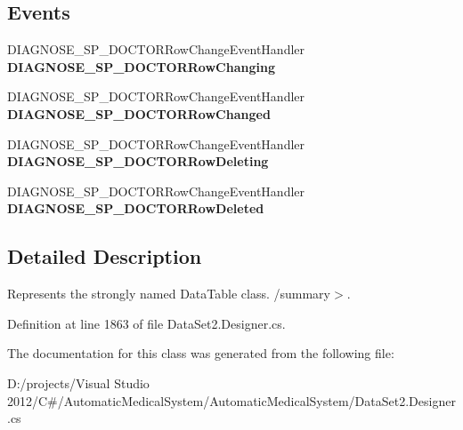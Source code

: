 \subsection*{Events}
\begin{CompactItemize}
\item 
DIAGNOSE\_\-SP\_\-DOCTORRowChangeEventHandler \textbf{DIAGNOSE\_\-SP\_\-DOCTORRowChanging}\label{class_automatic_medical_system_1_1_data_set2_1_1_d_i_a_g_n_o_s_e___s_p___d_o_c_t_o_r_data_table_3141f54b3352853dcc23b74daef34c98}

\item 
DIAGNOSE\_\-SP\_\-DOCTORRowChangeEventHandler \textbf{DIAGNOSE\_\-SP\_\-DOCTORRowChanged}\label{class_automatic_medical_system_1_1_data_set2_1_1_d_i_a_g_n_o_s_e___s_p___d_o_c_t_o_r_data_table_d996f4f04220f043ed6d542a8ad3f9d8}

\item 
DIAGNOSE\_\-SP\_\-DOCTORRowChangeEventHandler \textbf{DIAGNOSE\_\-SP\_\-DOCTORRowDeleting}\label{class_automatic_medical_system_1_1_data_set2_1_1_d_i_a_g_n_o_s_e___s_p___d_o_c_t_o_r_data_table_2841813e1adff927562ce958a0322a45}

\item 
DIAGNOSE\_\-SP\_\-DOCTORRowChangeEventHandler \textbf{DIAGNOSE\_\-SP\_\-DOCTORRowDeleted}\label{class_automatic_medical_system_1_1_data_set2_1_1_d_i_a_g_n_o_s_e___s_p___d_o_c_t_o_r_data_table_c977858984ee907cda0f3fa73f26c5c1}

\end{CompactItemize}


\subsection{Detailed Description}
Represents the strongly named DataTable class. /summary$>$. 

Definition at line 1863 of file DataSet2.Designer.cs.

The documentation for this class was generated from the following file:\begin{CompactItemize}
\item 
D:/projects/Visual Studio 2012/C\#/AutomaticMedicalSystem/AutomaticMedicalSystem/DataSet2.Designer.cs\end{CompactItemize}

